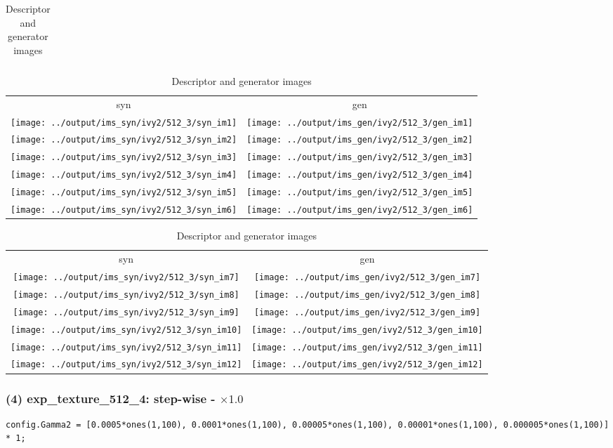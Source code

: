 \documentclass[letter]{article}
\begin{document}
\begin{table}[h!]
\begin{tabular}{c}
	\end{tabular}
	\begin{tabular}{cc}
		syn & gen\tabularnewline
		\texttt{[image: ../output/ims\_syn/ivy2/512\_3/syn\_im1]} & \texttt{[image: ../output/ims\_gen/ivy2/512\_3/gen\_im1]} \tabularnewline
		\texttt{[image: ../output/ims\_syn/ivy2/512\_3/syn\_im2]} & \texttt{[image: ../output/ims\_gen/ivy2/512\_3/gen\_im2]} \tabularnewline
		\texttt{[image: ../output/ims\_syn/ivy2/512\_3/syn\_im3]} & \texttt{[image: ../output/ims\_gen/ivy2/512\_3/gen\_im3]} \tabularnewline
		\texttt{[image: ../output/ims\_syn/ivy2/512\_3/syn\_im4]} & \texttt{[image: ../output/ims\_gen/ivy2/512\_3/gen\_im4]} \tabularnewline
		\texttt{[image: ../output/ims\_syn/ivy2/512\_3/syn\_im5]} & \texttt{[image: ../output/ims\_gen/ivy2/512\_3/gen\_im5]} \tabularnewline
		\texttt{[image: ../output/ims\_syn/ivy2/512\_3/syn\_im6]} & \texttt{[image: ../output/ims\_gen/ivy2/512\_3/gen\_im6]} \tabularnewline
	\end{tabular}
	\begin{tabular}{cc}
		syn & gen\tabularnewline
		\texttt{[image: ../output/ims\_syn/ivy2/512\_3/syn\_im7]} & \texttt{[image: ../output/ims\_gen/ivy2/512\_3/gen\_im7]} \tabularnewline
		\texttt{[image: ../output/ims\_syn/ivy2/512\_3/syn\_im8]} & \texttt{[image: ../output/ims\_gen/ivy2/512\_3/gen\_im8]} \tabularnewline
		\texttt{[image: ../output/ims\_syn/ivy2/512\_3/syn\_im9]} & \texttt{[image: ../output/ims\_gen/ivy2/512\_3/gen\_im9]} \tabularnewline
		\texttt{[image: ../output/ims\_syn/ivy2/512\_3/syn\_im10]} & \texttt{[image: ../output/ims\_gen/ivy2/512\_3/gen\_im10]} \tabularnewline
		\texttt{[image: ../output/ims\_syn/ivy2/512\_3/syn\_im11]} & \texttt{[image: ../output/ims\_gen/ivy2/512\_3/gen\_im11]} \tabularnewline
		\texttt{[image: ../output/ims\_syn/ivy2/512\_3/syn\_im12]} & \texttt{[image: ../output/ims\_gen/ivy2/512\_3/gen\_im12]} \tabularnewline
	\end{tabular}
	\caption{Descriptor and generator images}
\end{table}

\newpage

\subsubsection*{(4) exp\_texture\_512\_4: step-wise - $\times1.0$}

\begin{lstlisting}
config.Gamma2 = [0.0005*ones(1,100), 0.0001*ones(1,100), 0.00005*ones(1,100), 0.00001*ones(1,100), 0.000005*ones(1,100)] * 1;
\end{lstlisting}
\end{document}
